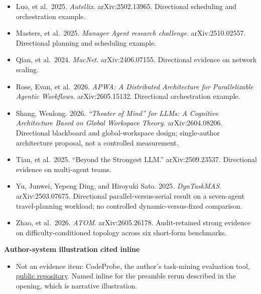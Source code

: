 \begin{itemize}
\item
  Luo, et al.~2025. \emph{Autellix}. arXiv:2502.13965. Directional scheduling and orchestration example.
\item
  Masters, et al.~2025. \emph{Manager Agent research challenge}. arXiv:2510.02557. Directional planning and scheduling example.
\item
  Qian, et al.~2024. \emph{MacNet}. arXiv:2406.07155. Directional evidence on network scaling.
\item
  Rose, Evan, et al.~2026. \emph{APWA: A Distributed Architecture for Parallelizable Agentic Workflows}. arXiv:2605.15132. Directional orchestration example.
\item
  Shang, Wenlong. 2026. \emph{``Theater of Mind'' for LLMs: A Cognitive Architecture Based on Global Workspace Theory}. arXiv:2604.08206. Directional blackboard and global-workspace design; single-author architecture proposal, not a controlled measurement.
\item
  Tian, et al.~2025. ``Beyond the Strongest LLM.'' arXiv:2509.23537. Directional evidence on multi-agent teams.
\item
  Yu, Junwei, Yepeng Ding, and Hiroyuki Sato. 2025. \emph{DynTaskMAS}. arXiv:2503.07675. Directional parallel-versus-serial result on a seven-agent travel-planning workload; no controlled dynamic-versus-fixed comparison.
\item
  Zhao, et al.~2026. \emph{ATOM}. arXiv:2605.26178. Audit-retained strong evidence on difficulty-conditioned topology across six short-form benchmarks.
\end{itemize}

\textbf{Author-system illustration cited inline}

\begin{itemize}
\tightlist
\item
  Not an evidence item: CodeProbe, the author's task-mining evaluation tool, \href{https://github.com/sjarmak/codeprobe}{public repository}. Named inline for the preamble rerun described in the opening, which is narrative illustration.
\end{itemize}
